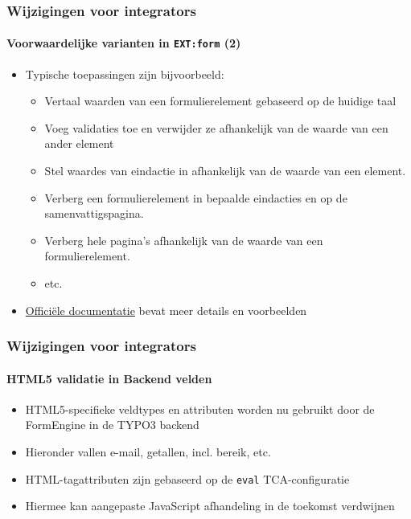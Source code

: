 \begin{frame}[fragile]
	\frametitle{Wijzigingen voor integrators}
	\framesubtitle{Voorwaardelijke varianten in \texttt{EXT:form} (2)}

	\begin{itemize}
		\item Typische toepassingen zijn bijvoorbeeld:

			\begin{itemize}
				\item Vertaal waarden van een formulierelement gebaseerd op de
					huidige taal
				\item Voeg validaties toe en verwijder ze afhankelijk van de waarde
					van een ander element
				\item Stel waardes van eindactie in afhankelijk van de waarde van een element.
				\item Verberg een formulierelement in bepaalde eindacties en op de samenvattigspagina.
				\item Verberg hele pagina's afhankelijk van de waarde van een formulierelement.
				\item etc.
			\end{itemize}

		\item \href{https://docs.typo3.org/typo3cms/extensions/form}{Officiële documentatie}
			bevat meer details en voorbeelden

	\end{itemize}

\end{frame}


\begin{frame}[fragile]
	\frametitle{Wijzigingen voor integrators}
	\framesubtitle{HTML5 validatie in Backend velden}

	\begin{itemize}
		\item HTML5-specifieke veldtypes en attributen worden nu gebruikt door
			de FormEngine in de TYPO3 backend
		\item Hieronder vallen e-mail, getallen, incl. bereik, etc.
		\item HTML-tagattributen zijn gebaseerd op de \texttt{eval} TCA-configuratie
		\item Hiermee kan aangepaste JavaScript afhandeling in de toekomst verdwijnen
	\end{itemize}

\end{frame}

